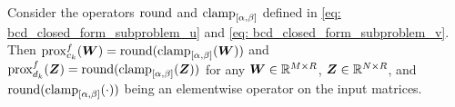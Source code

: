 \begin{lem}
    Consider the operators $\operatorname{round}$ and $\operatorname{clamp}_{[\alpha,\beta]}$ defined in \eqref{eq: bcd_closed_form_subproblem_u} and \eqref{eq: bcd_closed_form_subproblem_v}.
    Then $\operatorname{prox}^f_{c_k}(\bm W) = \operatorname{round}(\operatorname{clamp}_{[\alpha,\beta]}(\bm W))$ and $\operatorname{prox}^f_{d_k}(\bm Z) = \operatorname{round}(\operatorname{clamp}_{[\alpha,\beta]}(\bm Z))$ for any $\bm W\in \mathbb{R}^{M\times R}$, $\bm Z\in\mathbb{R}^{N\times R}$, and $\operatorname{round}(\operatorname{clamp}_{[\alpha,\beta]}(\cdot))$ being an elementwise operator on the input matrices.
\end{lem}
